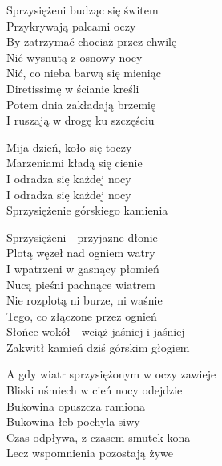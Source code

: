 \begin{text}
    \chordfill
    Sprzysiężeni budząc się świtem\\
    Przykrywają palcami oczy\\
    By zatrzymać chociaż przez chwilę\\
    Nić wysnutą z osnowy nocy\\
    Nić, co nieba barwą się mieniąc\\
    Diretissimę w ścianie kreśli\\
    Potem dnia zakładają brzemię\\
    I ruszają w drogę ku szczęściu

    \vin Mija dzień, koło się toczy\\
    \vin Marzeniami kładą się cienie\\
    \vin I odradza się każdej nocy\\
    \vin I odradza się każdej nocy\\
    \vin Sprzysiężenie górskiego kamienia

    Sprzysiężeni - przyjazne dłonie\\
    Plotą węzeł nad ogniem watry\\
    I wpatrzeni w gasnący płomień\\
    Nucą pieśni pachnące wiatrem\\
    Nie rozplotą ni burze, ni waśnie\\
    Tego, co złączone przez ognień\\
    Słońce wokół - wciąż jaśniej i jaśniej\\
    Zakwitł kamień dziś górskim głogiem

    A gdy wiatr sprzysiężonym w oczy zawieje\\
    Bliski uśmiech w cień nocy odejdzie\\
    Bukowina opuszcza ramiona\\
    Bukowina łeb pochyla siwy\\
    Czas odpływa, z czasem smutek kona\\
    Lecz wspomnienia pozostają żywe
\end{text}
